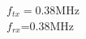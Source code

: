 \documentclass[preview]{standalone}
\begin{document}
\begin{center}
$f_{tx}=$0.38MHz\\$f_{rx}$=0.38MHz
\end{center}
\end{document}
